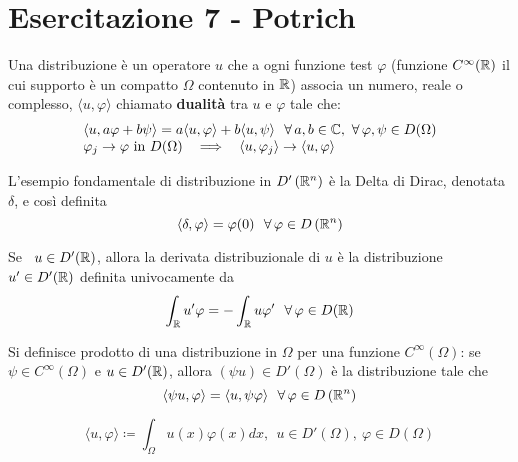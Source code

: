 \chapter{Esercitazione 7 - Potrich}
\ParteEsercizi
\begin{defn}
[Distribuzione] Una distribuzione è un operatore $u$ che a ogni funzione test $\varphi $ (funzione $C^{\infty}(\mathbb{R})$ il cui supporto è un compatto $\Omega $ contenuto in $\mathbb{R} $) associa un numero, reale o complesso, $\langle u, \varphi \rangle $ chiamato \textbf{dualità} tra $u$ e $\varphi $ tale che:
\begin{equation*}
\begin{array}{l}
\langle u, a\varphi + b\psi \rangle = a\langle u, \varphi \rangle + b\langle u, \psi \rangle \ \ \forall a, b\in \CC, \ \forall \varphi, \psi \in D(\Omega)\\
\varphi_{j}\rightarrow \varphi \ \text{in} \ D(\Omega) \ \ \implies \ \ \langle u, \varphi_{j} \rangle \rightarrow \langle u, \varphi \rangle
\end{array}
\end{equation*}
\end{defn}
\begin{rem}
 L'esempio fondamentale di distribuzione in $D'\left(\mathbb{R}^{n}\right)$ è la Delta di Dirac, denotata $\delta $, e così definita
\begin{equation*}
\langle \delta, \varphi \rangle = \varphi (0) \ \ \forall \varphi \in D\left(\RR^{n}\right)
\end{equation*}
\end{rem}
\begin{defn}
Se \ $u\in D'(\mathbb{R})$, allora la derivata distribuzionale di $u$ è la distribuzione $u'\in D'(\mathbb{R})$ definita univocamente da
\begin{equation*}
\int_{\RR} u'\varphi = - \int_{\RR} u\varphi '\ \ \forall \varphi \in D(\RR)
\end{equation*}
\end{defn}
\begin{defn}
Si definisce prodotto di una distribuzione in $\Omega $ per una funzione $C^{\infty}(\Omega)$: se $\psi \in C^{\infty}(\Omega)$ e $u\in D'(\mathbb{R})$, allora $(\psi u) \in D'(\Omega)$ è la distribuzione tale che
\begin{equation*}
\langle \psi u, \varphi \rangle = \langle u, \psi \varphi \rangle \ \ \forall \varphi \in D\left(\RR^{n}\right)
\end{equation*}
\end{defn}
\begin{rem}
\begin{equation*}
\langle u, \varphi \rangle \coloneqq \int_{\Omega} u(x) \varphi (x) dx, \ \ u\in D'(\Omega), \ \varphi \in D(\Omega)
\end{equation*}
\end{rem}
\Esercizio{}

